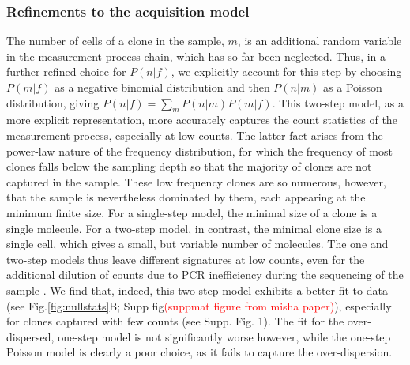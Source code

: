 \documentclass[letterpaper,english,prl,reprint,longbibliography]{revtex4-1} %
\begin{document}
\subsubsection*{Refinements to the acquisition model}
The number of cells of a clone in the sample, $m$, is an additional random variable in the measurement process chain, which has so far been neglected. 
Thus, in a further refined choice for $P(n|f)$, we explicitly account for this step by choosing $P(m|f)$ as a negative binomial distribution and then $P(n|m)$ as a Poisson distribution, giving $P(n|f)=\sum_m P(n|m)P(m|f)$. 
This two-step model, as a more explicit representation, more accurately captures the count statistics of the measurement process, especially at low counts. 
The latter fact arises from the power-law nature of the frequency distribution, for which the frequency of most clones falls below the sampling depth so that the majority of clones are not captured in the sample. 
These low frequency clones are so numerous, however, that the sample is nevertheless dominated by them, each appearing at the minimum finite size. 
For a single-step model, the minimal size of a clone is a single molecule. 
For a two-step model, in contrast, the minimal clone size is a single cell, which gives a small, but variable number of molecules. 
The one and two-step models thus leave different signatures at low counts, even for the additional dilution of counts due to PCR inefficiency during the sequencing of the sample \citep{Best2015a}.
We find that, indeed, this two-step model exhibits a better fit to data (see Fig.\ref{fig:nullstats}B; Supp fig\textcolor{red}{(suppmat figure from misha paper)}), especially for clones captured with few counts (see Supp. Fig. 1). 
The fit for the over-dispersed, one-step model is not significantly worse however, while the one-step Poisson model is clearly a poor choice, as it fails to capture the over-dispersion.
\end{document}
